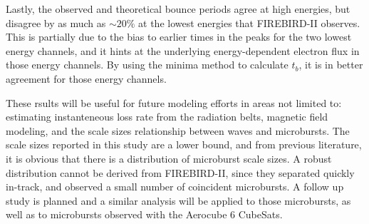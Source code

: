 \documentclass[draft,linenumbers]{agujournal}
\begin{document}
Lastly, the observed and theoretical bounce periods agree at high energies, but disagree by as much as $\sim 20 \%$ at the lowest energies that FIREBIRD-II observes. This is partially due to the bias to earlier times in the peaks for the two lowest energy channels, and it hints at the underlying energy-dependent electron flux in those energy channels. By using the minima method to calculate $t_b$, it is in better agreement for those energy channels. 

These rsults will be useful for future modeling efforts in areas not limited to: estimating instanteneous loss rate from the radiation belts, magnetic field modeling, and the scale sizes relationship between waves and microbursts. The scale sizes reported in this study are a lower bound, and from previous literature, it is obvious that there is a distribution of microburst scale sizes. A robust distribution cannot be derived from FIREBIRD-II, since they separated quickly in-track, and observed a small number of coincident microbursts. A follow up study is planned and a similar analysis will be applied to those microbursts, as well as to microbursts observed with the Aerocube 6 CubeSats.




\end{document}
